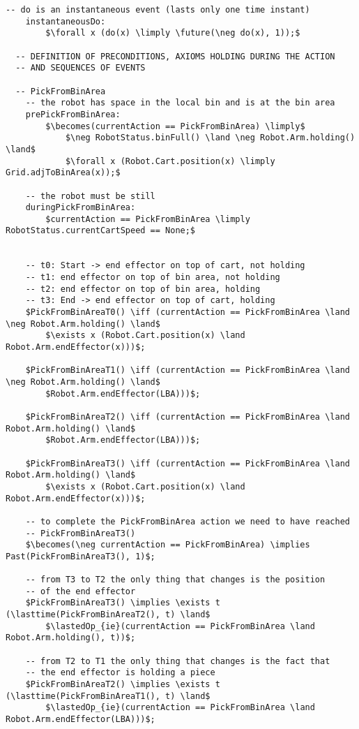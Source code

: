 \begin{lstlisting}[fontadjust, mathescape, frame=single]
    -- do is an instantaneous event (lasts only one time instant)
    instantaneousDo:
        $\forall x (do(x) \limply \future(\neg do(x), 1));$

  -- DEFINITION OF PRECONDITIONS, AXIOMS HOLDING DURING THE ACTION 
  -- AND SEQUENCES OF EVENTS

  -- PickFromBinArea
    -- the robot has space in the local bin and is at the bin area
    prePickFromBinArea:
        $\becomes(currentAction == PickFromBinArea) \limply$
            $\neg RobotStatus.binFull() \land \neg Robot.Arm.holding() \land$
            $\forall x (Robot.Cart.position(x) \limply Grid.adjToBinArea(x));$

    -- the robot must be still
    duringPickFromBinArea:
        $currentAction == PickFromBinArea \limply RobotStatus.currentCartSpeed == None;$

    
    -- t0: Start -> end effector on top of cart, not holding
    -- t1: end effector on top of bin area, not holding
    -- t2: end effector on top of bin area, holding
    -- t3: End -> end effector on top of cart, holding
    $PickFromBinAreaT0() \iff (currentAction == PickFromBinArea \land \neg Robot.Arm.holding() \land$
        $\exists x (Robot.Cart.position(x) \land Robot.Arm.endEffector(x)))$;
    
    $PickFromBinAreaT1() \iff (currentAction == PickFromBinArea \land \neg Robot.Arm.holding() \land$
        $Robot.Arm.endEffector(LBA)))$;
    
    $PickFromBinAreaT2() \iff (currentAction == PickFromBinArea \land Robot.Arm.holding() \land$
        $Robot.Arm.endEffector(LBA)))$;
    
    $PickFromBinAreaT3() \iff (currentAction == PickFromBinArea \land Robot.Arm.holding() \land$
        $\exists x (Robot.Cart.position(x) \land Robot.Arm.endEffector(x)))$;
    
    -- to complete the PickFromBinArea action we need to have reached
    -- PickFromBinAreaT3()
    $\becomes(\neg currentAction == PickFromBinArea) \implies Past(PickFromBinAreaT3(), 1)$;
    
    -- from T3 to T2 the only thing that changes is the position
    -- of the end effector
    $PickFromBinAreaT3() \implies \exists t (\lasttime(PickFromBinAreaT2(), t) \land$
        $\lastedOp_{ie}(currentAction == PickFromBinArea \land Robot.Arm.holding(), t))$;

    -- from T2 to T1 the only thing that changes is the fact that
    -- the end effector is holding a piece
    $PickFromBinAreaT2() \implies \exists t (\lasttime(PickFromBinAreaT1(), t) \land$
        $\lastedOp_{ie}(currentAction == PickFromBinArea \land Robot.Arm.endEffector(LBA)))$;
    

\end{lstlisting}
